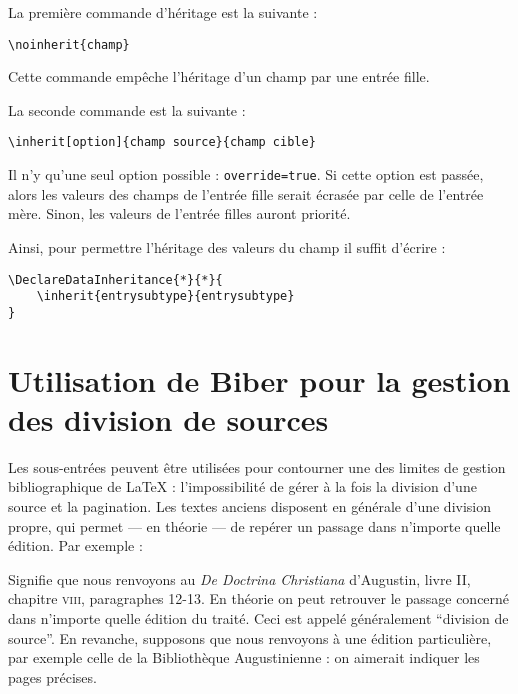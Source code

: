 La première commande d'héritage est la suivante :

\begin{verbatim}
\noinherit{champ}
\end{verbatim}

Cette commande empêche l'héritage d'un champ par une entrée fille.

La seconde commande est la suivante :

\begin{verbatim}
\inherit[option]{champ source}{champ cible}
\end{verbatim}

Il n'y qu'une seul option possible : \verb|override=true|. Si cette option est passée, alors les valeurs des champs de l'entrée fille serait écrasée par celle de l'entrée mère. Sinon, les valeurs de l'entrée filles auront priorité.

Ainsi, pour permettre l'héritage des valeurs du champ  il suffit d'écrire :

\begin{verbatim}
\DeclareDataInheritance{*}{*}{
	\inherit{entrysubtype}{entrysubtype}
}
\end{verbatim}

\section[Division des sources antiques]{Utilisation de Biber pour la gestion des division de sources}

Les sous-entrées peuvent être utilisées pour contourner une des limites de gestion bibliographique de \LaTeX{} : l'impossibilité de gérer à la fois  la division d'une source et la pagination. Les textes anciens disposent en générale d'une division propre, qui permet --- en théorie ---  de repérer un passage dans n'importe quelle édition. Par exemple : 

\begin{quote}
\cite{DoctrineChretienneDivision}
\end{quote}

Signifie que nous renvoyons au \emph{De Doctrina Christiana} d'Augustin, livre II, chapitre \textsc{viii}, paragraphes 12-13. En théorie on peut retrouver le passage concerné dans n'importe quelle édition du traité. Ceci est appelé généralement \enquote{division de source}.
En revanche, supposons que nous renvoyons à une édition particulière, par exemple celle de la Bibliothèque Augustinienne : on aimerait indiquer les pages précises.

